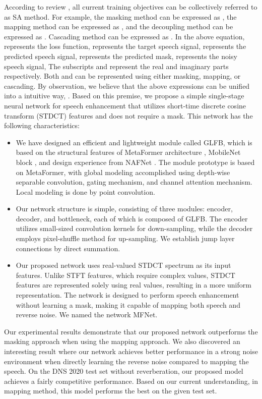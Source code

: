 \documentclass{INTERSPEECH2023}
\begin{document}
According to review \cite{overview}, all current training objectives can be collectively referred to as SA method. For example, the masking method can be expressed as  
, the mapping method can be expressed as
, and the decoupling method can be expressed as
. 
Cascading method can be expressed as
.
In the above equation,  represents the loss function,  represents the target speech signal,  represents the predicted speech signal,  represents the predicted mask,   represents the noisy speech signal, The subscripts  and  represent the real and imaginary parts respectively. Both  and  can be represented using either masking, mapping, or cascading. By observation, we believe that the above expressions can be unified into a intuitive way, 
. Based on this premise, we propose a simple single-stage neural network for speech enhancement that utilizes short-time discrete cosine transform (STDCT) \cite{rao2014discrete} features and does not require a mask. This network has the following characteristics:
\begin{itemize}
    \item We have designed an efficient and lightweight module called GLFB, which is based on the structural features of MetaFormer architecture \cite{yu2022metaformer}, MobileNet block \cite{sandler2018mobilenetv2}, and design experience from NAFNet \cite{chen2022simple}. The module prototype is based on MetaFormer, with global modeling accomplished using depth-wise separable convolution, gating mechanism, and channel attention mechanism. Local modeling is done by point convolution.

\item Our network structure is simple, consisting of three modules: encoder, decoder, and bottleneck, each of which is composed of GLFB. The encoder utilizes small-sized convolution kernels for down-sampling, while the decoder employs pixel-shuffle method for up-sampling. We establish jump layer connections by direct summation.

\item Our proposed network uses real-valued STDCT spectrum as its input features. Unlike STFT features, which require complex values, STDCT features are represented solely using real values, resulting in a more uniform representation. The network is designed to perform speech enhancement without learning a mask, making it capable of mapping both speech and reverse noise. We named the network MFNet.
\end{itemize}


Our experimental results demonstrate that our proposed network outperforms the masking approach when using the mapping approach. We also discovered an interesting result where our network achieves better performance in a strong noise environment when directly learning the reverse noise compared to mapping the speech. On the DNS 2020 test set without reverberation, our proposed model achieves a fairly competitive performance. Based on our current understanding, in mapping method, this model performs the best on the given test set. 
\end{document}
